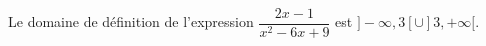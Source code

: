 Le domaine de définition de l'expression $\dfrac{2x-1}{x^2-6x+9}$ est $]-\infty,3[\cup ]3,+\infty[$.

\begin{reponses}
\end{reponses}


